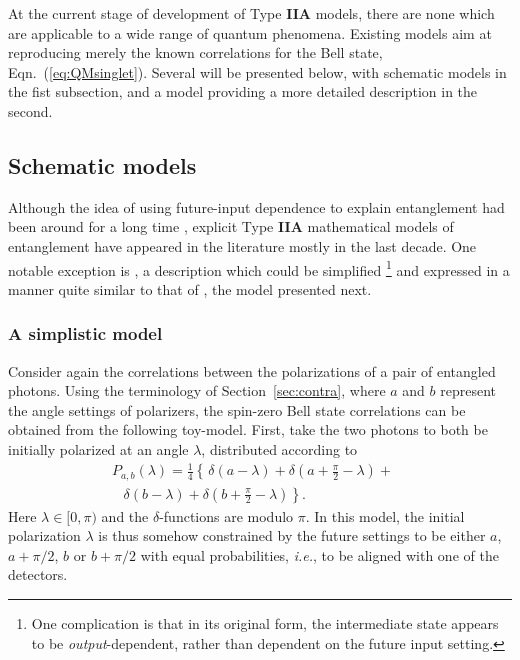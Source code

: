 \documentclass[rmp, aps, preprint, longbibliography]{revtex4-1}
\begin{document}
At the current stage of development of Type {\bf IIA} models, there are none which are applicable to a wide range of quantum phenomena.  Existing models aim at reproducing merely the known correlations for the Bell state, Eqn.~(\ref{eq:QMsinglet}).  Several will be presented below, with schematic models in the fist subsection, and a model providing a more detailed description in the second.

\subsection{Schematic models}
\label{sec:PoP}

Although the idea of using future-input dependence to explain entanglement had been around for a long time \cite{costa1953,costa1977,costa1979, cramer1980,pegg1982,sutherland1983,price1984,price1997}, explicit Type {\bf IIA} mathematical models of entanglement have appeared in the literature mostly in the last decade.  One notable exception is \textcite{pegg1982}, a description which could be simplified%
\footnote{One complication is that in its original form, the intermediate state appears to be {\em output}-dependent, rather than dependent on the future input setting.}
and expressed in a manner quite similar to that of \textcite{argaman2010}, the model presented next.

\subsubsection{A simplistic model}

Consider again the correlations between the polarizations of a pair of entangled photons.  Using the terminology of Section~\ref{sec:contra}, where $a$ and $b$ represent the angle settings of polarizers, the spin-zero Bell state correlations can be obtained from the following toy-model.  First, take the two photons to both be initially polarized at an angle $\lambda$, distributed according to 
\begin{equation}
\label{eq:Argaman}
\begin{split}
P_{a,b}
(\lambda) = \frac{1}{4} \left\{ \frac{}{} \delta (a-\lambda) +
\delta \left(a+\frac{\pi}{2}-\lambda \right) + 
\right. \quad \\ \left. \;\;\; 
\delta(b-\lambda) + \delta \left(b+\frac{\pi}{2}-\lambda \right)  \right\}.
\end{split}
\end{equation}
Here $\lambda \in [0,\pi)$ and the $\delta$-functions are modulo $\pi$.  In this model, the initial polarization $\lambda$ is thus somehow constrained by the future settings to be either $a$, $a+\pi/2$, $b$ or $b+\pi/2$ with equal probabilities, \emph{i.e.}, to be aligned with one of the detectors.  
\end{document}
